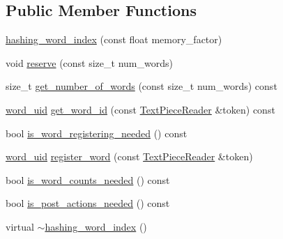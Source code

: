 \subsection*{Public Member Functions}
\begin{DoxyCompactItemize}
\item 
\hyperlink{classuva_1_1smt_1_1bpbd_1_1server_1_1lm_1_1dictionary_1_1hashing__word__index_a9e8eaf9a1c9ad275054e08123077c0e3}{hashing\+\_\+word\+\_\+index} (const float memory\+\_\+factor)
\item 
void \hyperlink{classuva_1_1smt_1_1bpbd_1_1server_1_1lm_1_1dictionary_1_1hashing__word__index_ad6c3355af70f7fe393d550ba1ef80eaf}{reserve} (const size\+\_\+t num\+\_\+words)
\item 
size\+\_\+t \hyperlink{classuva_1_1smt_1_1bpbd_1_1server_1_1lm_1_1dictionary_1_1hashing__word__index_ad90a3b5d230d14369f1e9caeb0daceb3}{get\+\_\+number\+\_\+of\+\_\+words} (const size\+\_\+t num\+\_\+words) const 
\item 
\hyperlink{namespaceuva_1_1smt_1_1bpbd_1_1server_a6bfe45ba344d65a7fdd7d26156328ddc}{word\+\_\+uid} \hyperlink{classuva_1_1smt_1_1bpbd_1_1server_1_1lm_1_1dictionary_1_1hashing__word__index_ade75899cedae8daf46bcbf3ff8e86fdb}{get\+\_\+word\+\_\+id} (const \hyperlink{classuva_1_1utils_1_1file_1_1_text_piece_reader}{Text\+Piece\+Reader} \&token) const 
\item 
bool \hyperlink{classuva_1_1smt_1_1bpbd_1_1server_1_1lm_1_1dictionary_1_1hashing__word__index_a494bd9b1e49904deee1f8234e83cc481}{is\+\_\+word\+\_\+registering\+\_\+needed} () const 
\item 
\hyperlink{namespaceuva_1_1smt_1_1bpbd_1_1server_a6bfe45ba344d65a7fdd7d26156328ddc}{word\+\_\+uid} \hyperlink{classuva_1_1smt_1_1bpbd_1_1server_1_1lm_1_1dictionary_1_1hashing__word__index_a63bc9c672ca8d76f77ad7080b4b396ce}{register\+\_\+word} (const \hyperlink{classuva_1_1utils_1_1file_1_1_text_piece_reader}{Text\+Piece\+Reader} \&token)
\item 
bool \hyperlink{classuva_1_1smt_1_1bpbd_1_1server_1_1lm_1_1dictionary_1_1hashing__word__index_ab8f071a53701f66b24cb9ea1e835cc66}{is\+\_\+word\+\_\+counts\+\_\+needed} () const 
\item 
bool \hyperlink{classuva_1_1smt_1_1bpbd_1_1server_1_1lm_1_1dictionary_1_1hashing__word__index_a06f3b8b334fd66631778e4db24d001d1}{is\+\_\+post\+\_\+actions\+\_\+needed} () const 
\item 
virtual \hyperlink{classuva_1_1smt_1_1bpbd_1_1server_1_1lm_1_1dictionary_1_1hashing__word__index_a9d0f52f1beec29b30d4d24d5d30118ad}{$\sim$hashing\+\_\+word\+\_\+index} ()
\end{DoxyCompactItemize}
